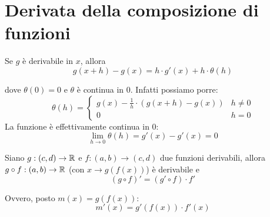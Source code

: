 \section{Derivata della composizione di funzioni}
\begin{remark}
Se $g$ è derivabile in $x$, allora
\begin{equation*}
g(x+h) - g(x) = h \cdot g'(x) + h \cdot \theta (h)
\end{equation*}

dove $\theta(0) = 0$ e $\theta$ è continua in 0. Infatti possiamo porre: 
\begin{equation*}
\theta (h) = \begin{cases}
g(x) - \frac{1}{h} \cdot (g(x+h)-g(x)) & h \neq 0 \\
0 & h = 0
\end{cases}
\end{equation*}
La funzione è effettivamente continua in 0:
\begin{equation*}
\lim_{h \to 0} \theta (h) = g'(x) - g'(x) = 0
\end{equation*}
\end{remark}

\begin{theorem}
Siano $g:(c,d) \to \mathbb R$ e $f:(a,b) \to (c,d)$ due funzioni derivabili, allora $g \circ f : (a,b) \to \mathbb R$ (con $x \to g(f(x))$) è derivabile e
\begin{equation*}
(g \circ f)' = (g' \circ f) \cdot f'
\end{equation*}
\end{theorem}
Ovvero, posto $m(x) = g(f(x))$:
\begin{equation*}
m'(x) = g'(f(x)) \cdot f'(x)
\end{equation*}

